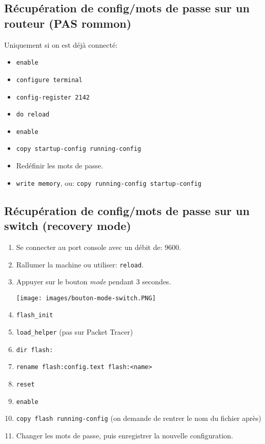 \documentclass[a4paper]{article}
\begin{document}
\subsection{Récupération de config/mots de passe sur un routeur (PAS rommon)}



Uniquement si on est déjà connecté:
\begin{itemize}[label=\textbf{–}]
    \item \texttt{enable}
    \item \texttt{configure terminal}
    \item \texttt{config-register 2142}
    \item \texttt{do reload}
    \item \texttt{enable}
    \item \texttt{copy startup-config running-config}
    \item Redéfinir les mots de passe.
    \item \texttt{write memory}, ou: \texttt{copy running-config startup-config}
\end{itemize}





\subsection{Récupération de config/mots de passe sur un switch (recovery mode)}



\begin{enumerate}
    \item Se connecter au port console avec un débit de: 9600.
    \item Rallumer la machine ou utiliser: \texttt{reload}.
    \item Appuyer sur le bouton \textit{mode} pendant 3 secondes.
    \begin{center}
        \texttt{[image: images/bouton-mode-switch.PNG]}
    \end{center}
    \item \texttt{flash\_init}
    \item \texttt{load\_helper} (pas sur Packet Tracer)
    \item \texttt{dir flash:}
    \item \texttt{rename flash:config.text flash:<name>}
    \item \texttt{reset}
    \item \texttt{enable}
    \item \texttt{copy flash running-config} (on demande de rentrer le nom du fichier après)
    \item Changer les mots de passe, puis enregistrer la nouvelle configuration.
\end{enumerate}
\end{document}
